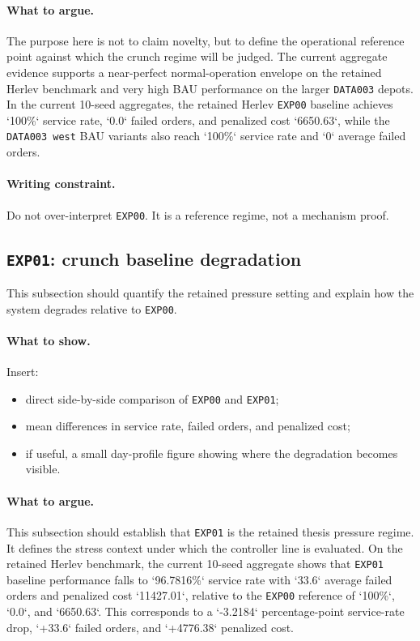 \paragraph{What to argue.}
The purpose here is not to claim novelty, but to define the operational reference point against which the crunch regime will be judged.
The current aggregate evidence supports a near-perfect normal-operation envelope on the retained Herlev benchmark and very high BAU performance on the larger \texttt{DATA003} depots.
In the current 10-seed aggregates, the retained Herlev \texttt{EXP00} baseline achieves `100\%` service rate, `0.0` failed orders, and penalized cost `6650.63`, while the \texttt{DATA003 west} BAU variants also reach `100\%` service rate and `0` average failed orders.

\paragraph{Writing constraint.}
Do not over-interpret \texttt{EXP00}. It is a reference regime, not a mechanism proof.

\subsection{\texttt{EXP01}: crunch baseline degradation}
\label{sec:results-exp01}

This subsection should quantify the retained pressure setting and explain how the system degrades relative to \texttt{EXP00}.

\paragraph{What to show.}
Insert:
\begin{itemize}
    \item direct side-by-side comparison of \texttt{EXP00} and \texttt{EXP01};
    \item mean differences in service rate, failed orders, and penalized cost;
    \item if useful, a small day-profile figure showing where the degradation becomes visible.
\end{itemize}

\paragraph{What to argue.}
This subsection should establish that \texttt{EXP01} is the retained thesis pressure regime.
It defines the stress context under which the controller line is evaluated.
On the retained Herlev benchmark, the current 10-seed aggregate shows that \texttt{EXP01} baseline performance falls to `96.7816\%` service rate with `33.6` average failed orders and penalized cost `11427.01`, relative to the \texttt{EXP00} reference of `100\%`, `0.0`, and `6650.63`.
This corresponds to a `-3.2184` percentage-point service-rate drop, `+33.6` failed orders, and `+4776.38` penalized cost.

